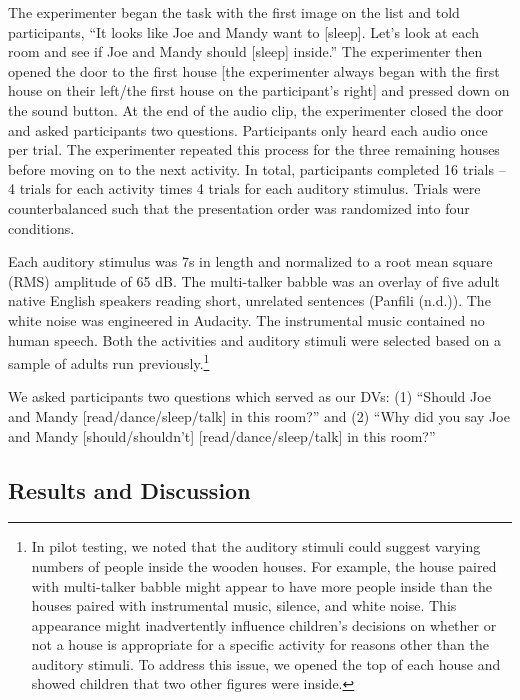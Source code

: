 \documentclass[10pt, letterpaper]{article}
\begin{document}
The experimenter began the task with the first image on the list and
told participants, ``It looks like Joe and Mandy want to {[}sleep{]}.
Let's look at each room and see if Joe and Mandy should {[}sleep{]}
inside.'' The experimenter then opened the door to the first house
{[}the experimenter always began with the first house on their left/the
first house on the participant's right{]} and pressed down on the sound
button. At the end of the audio clip, the experimenter closed the door
and asked participants two questions. Participants only heard each audio
once per trial. The experimenter repeated this process for the three
remaining houses before moving on to the next activity. In total,
participants completed 16 trials -- 4 trials for each activity times 4
trials for each auditory stimulus. Trials were counterbalanced such that
the presentation order was randomized into four conditions.

Each auditory stimulus was 7s in length and normalized to a root mean
square (RMS) amplitude of 65 dB. The multi-talker babble was an overlay
of five adult native English speakers reading short, unrelated sentences
(Panfili (n.d.)). The white noise was engineered in Audacity. The
instrumental music contained no human speech. Both the activities and
auditory stimuli were selected based on a sample of adults run
previously.\footnote{In pilot testing, we noted that  the auditory stimuli could suggest varying numbers of people inside the wooden houses. For example, the house paired with multi-talker babble might appear to have more  people inside than the houses paired with instrumental music, silence, and white noise. This appearance might inadvertently influence children's decisions on whether or not a house is appropriate for a specific activity for reasons other than the auditory stimuli. To address this issue, we opened the top of each house and showed children that two other figures were inside.}

We asked participants two questions which served as our DVs: (1)
``Should Joe and Mandy {[}read/dance/sleep/talk{]} in this room?'' and
(2) ``Why did you say Joe and Mandy {[}should/shouldn't{]}
{[}read/dance/sleep/talk{]} in this room?''

\hypertarget{results-and-discussion}{%
\subsection{Results and Discussion}\label{results-and-discussion}}
\end{document}
